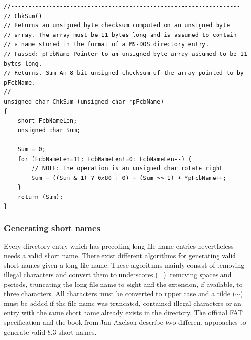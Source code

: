 \lstset{language=c}
\begin{lstlisting}[caption=Calculation of short name checksum in C \cite{fatgen103}, label=listing:fat_checksum]
//------------------------------------------------------------------
// ChkSum()
// Returns an unsigned byte checksum computed on an unsigned byte
// array. The array must be 11 bytes long and is assumed to contain
// a name stored in the format of a MS-DOS directory entry.
// Passed: pFcbName Pointer to an unsigned byte array assumed to be 11 bytes long.
// Returns: Sum An 8-bit unsigned checksum of the array pointed to by pFcbName.
//-------------------------------------------------------------------
unsigned char ChkSum (unsigned char *pFcbName)
{
    short FcbNameLen;
    unsigned char Sum;
    
    Sum = 0;
    for (FcbNameLen=11; FcbNameLen!=0; FcbNameLen--) {
        // NOTE: The operation is an unsigned char rotate right
        Sum = ((Sum & 1) ? 0x80 : 0) + (Sum >> 1) + *pFcbName++;
    }
    return (Sum);
}
\end{lstlisting}

\subsubsection{Generating short names}

Every directory entry which has preceding long file name entries nevertheless needs a valid short name. There exist different algorithms for generating valid short names given a long file name. These algorithms mainly consist of removing illegal characters and convert them to underscores (\_), removing spaces and periods, truncating the long file name to eight and the extension, if available, to three characters. All characters must be converted to upper case and a tilde ($\sim$) must be added if the file name was truncated, contained illegal characters or an entry with the same short name already exists in the directory. The official FAT specification\cite{fatgen103} and the book from Jan Axelson\cite{usb_ms_jan} describe two different approaches to generate valid 8.3 short names.